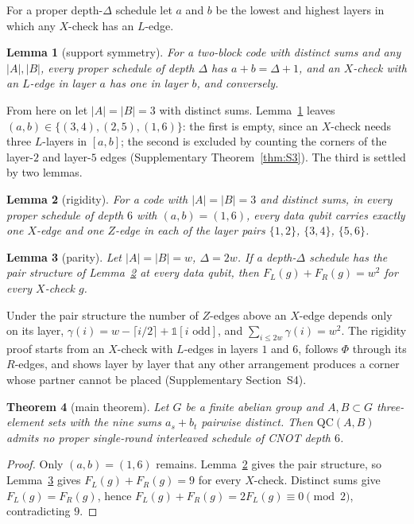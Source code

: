 \documentclass[reprint,twocolumn,superscriptaddress,nofootinbib]{revtex4-2}
\theoremstyle{plain}
\newtheorem{theorem}{Theorem}
\newtheorem{lemma}[theorem]{Lemma}
\begin{document}
For a proper depth-$\Delta$ schedule let $a$ and $b$ be the lowest and
highest layers in which any $X$-check has an $L$-edge.

\begin{lemma}[support symmetry]
\label{lem:support}
For a two-block code with distinct sums and any $|A|,|B|$, every proper
schedule of depth $\Delta$ has $a+b=\Delta+1$, and an $X$-check with an
$L$-edge in layer $a$ has one in layer $b$, and conversely.
\end{lemma}

From here on let $|A|=|B|=3$ with distinct sums. Lemma~\ref{lem:support}
leaves $(a,b)\in\{(3,4),(2,5),(1,6)\}$: the first is empty, since an
$X$-check needs three $L$-layers in $[a,b]$; the second is excluded by
counting the corners of the layer-$2$ and layer-$5$ edges (Supplementary
Theorem~\ref{thm:S3}). The third is settled by two lemmas.

\begin{lemma}[rigidity]
\label{lem:rigidity}
For a code with $|A|=|B|=3$ and distinct sums, in every proper schedule of
depth $6$ with $(a,b)=(1,6)$, every data qubit carries exactly one $X$-edge
and one $Z$-edge in each of the layer pairs $\{1,2\}$, $\{3,4\}$,
$\{5,6\}$.
\end{lemma}

\begin{lemma}[parity]
\label{lem:parity}
Let $|A|=|B|=w$, $\Delta=2w$. If a depth-$\Delta$ schedule has the pair
structure of Lemma~\ref{lem:rigidity} at every data qubit, then
$F_L(g)+F_R(g)=w^2$ for every $X$-check $g$.
\end{lemma}

Under the pair structure the number of $Z$-edges above an $X$-edge depends
only on its layer, $\gamma(i)=w-\lceil i/2\rceil+\mathbb{1}[i\text{ odd}]$,
and $\sum_{i\le2w}\gamma(i)=w^2$. The rigidity proof starts from an
$X$-check with $L$-edges in layers $1$ and $6$, follows $\Phi$ through its
$R$-edges, and shows layer by layer that any other arrangement produces a
corner whose partner cannot be placed (Supplementary Section~S4).

\begin{theorem}[main theorem]
\label{thm:main}
Let $G$ be a finite abelian group and $A,B\subset G$ three-element sets
with the nine sums $a_s+b_t$ pairwise distinct. Then $\mathrm{QC}(A,B)$
admits no proper single-round interleaved schedule of CNOT depth $6$.
\end{theorem}

\begin{proof}
Only $(a,b)=(1,6)$ remains. Lemma~\ref{lem:rigidity} gives the pair
structure, so Lemma~\ref{lem:parity} gives $F_L(g)+F_R(g)=9$ for every
$X$-check. Distinct sums give $F_L(g)=F_R(g)$, hence
$F_L(g)+F_R(g)=2F_L(g)\equiv0\pmod 2$, contradicting $9$.
\end{proof}
\end{document}
